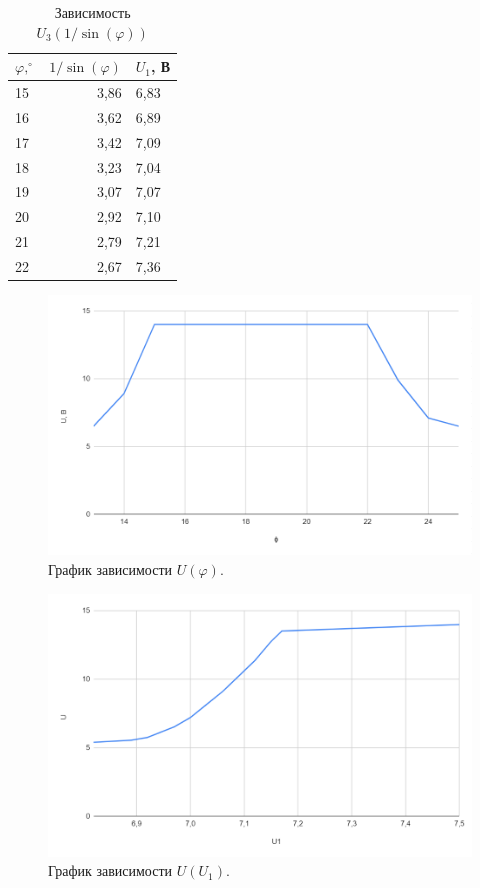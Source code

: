 \documentclass[12pt]{article}
\begin{document}
	\begin{table}[H]
		\centering
		\begin{tabular}{|l|r|l|}
			\hline
			$\varphi, ^\circ$ & \multicolumn{1}{l|}{$1/\sin(\varphi)$} & $U_1$, В \\ \hline
			15                & 3,86                                           & 6,83     \\ \hline
			16                & 3,62                                           & 6,89     \\ \hline
			17                & 3,42                                           & 7,09     \\ \hline
			18                & 3,23                                           & 7,04     \\ \hline
			19                & 3,07                                           & 7,07     \\ \hline
			20                & 2,92                                           & 7,10     \\ \hline
			21                & 2,79                                           & 7,21     \\ \hline
			22                & 2,67                                           & 7,36     \\ \hline
		\end{tabular}
		\caption{Зависимость $U_3(1/\sin(\varphi))$}
	\end{table}
	\begin{figure}[H]
		\centering
		\includegraphics[width=\linewidth]{graph1}
		\caption{График зависимости $U(\varphi)$.}
	\end{figure}
	\begin{figure}[H]
		\centering
		\includegraphics[width=0.9\linewidth]{graph2}
		\caption{График зависимости $U(U_1)$.}
	\end{figure}
\end{document}
